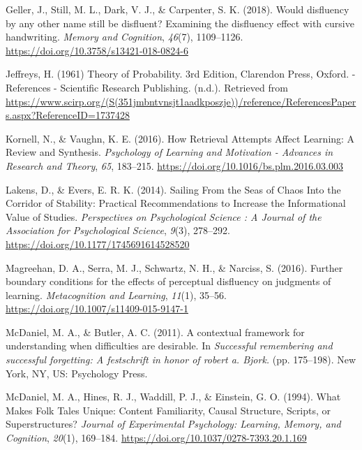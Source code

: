 \documentclass[english,doc]{apa6}
\begin{document}
\leavevmode\hypertarget{ref-Geller2018}{}%
Geller, J., Still, M. L., Dark, V. J., \& Carpenter, S. K. (2018). Would disfluency by any other name still be disfluent? Examining the disfluency effect with cursive handwriting. \emph{Memory and Cognition}, \emph{46}(7), 1109--1126. \url{https://doi.org/10.3758/s13421-018-0824-6}

\leavevmode\hypertarget{ref-Jeff1961}{}%
Jeffreys, H. (1961) Theory of Probability. 3rd Edition, Clarendon Press, Oxford. - References - Scientific Research Publishing. (n.d.). Retrieved from \url{https://www.scirp.org/(S(351jmbntvnsjt1aadkposzje))/reference/ReferencesPapers.aspx?ReferenceID=1737428}

\leavevmode\hypertarget{ref-Kornell2016}{}%
Kornell, N., \& Vaughn, K. E. (2016). How Retrieval Attempts Affect Learning: A Review and Synthesis. \emph{Psychology of Learning and Motivation - Advances in Research and Theory}, \emph{65}, 183--215. \url{https://doi.org/10.1016/bs.plm.2016.03.003}

\leavevmode\hypertarget{ref-Lakens2014}{}%
Lakens, D., \& Evers, E. R. K. (2014). Sailing From the Seas of Chaos Into the Corridor of Stability: Practical Recommendations to Increase the Informational Value of Studies. \emph{Perspectives on Psychological Science : A Journal of the Association for Psychological Science}, \emph{9}(3), 278--292. \url{https://doi.org/10.1177/1745691614528520}

\leavevmode\hypertarget{ref-Magreehan2016}{}%
Magreehan, D. A., Serra, M. J., Schwartz, N. H., \& Narciss, S. (2016). Further boundary conditions for the effects of perceptual disfluency on judgments of learning. \emph{Metacognition and Learning}, \emph{11}(1), 35--56. \url{https://doi.org/10.1007/s11409-015-9147-1}

\leavevmode\hypertarget{ref-McDaniel2011}{}%
McDaniel, M. A., \& Butler, A. C. (2011). A contextual framework for understanding when difficulties are desirable. In \emph{Successful remembering and successful forgetting: A festschrift in honor of robert a. Bjork.} (pp. 175--198). New York, NY, US: Psychology Press.

\leavevmode\hypertarget{ref-McDaniel1994}{}%
McDaniel, M. A., Hines, R. J., Waddill, P. J., \& Einstein, G. O. (1994). What Makes Folk Tales Unique: Content Familiarity, Causal Structure, Scripts, or Superstructures? \emph{Journal of Experimental Psychology: Learning, Memory, and Cognition}, \emph{20}(1), 169--184. \url{https://doi.org/10.1037/0278-7393.20.1.169}
\end{document}
